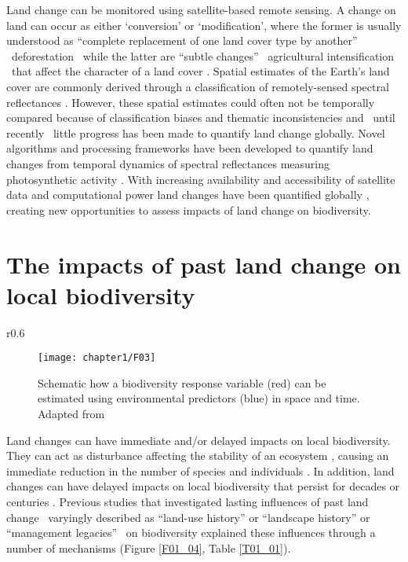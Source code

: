 Land change can be monitored using satellite-based remote sensing. A change on land can occur as either ‘conversion’ or ‘modification’, where the former is usually understood as “complete replacement of one land cover type by another” \textendash\ \ie deforestation \textendash\ while the latter are “subtle changes” \textendash\ \ie agricultural intensification \textendash\ that affect the character of a land cover \citep{Lambin2003,Lambin2006}. Spatial estimates of the Earth’s land cover are commonly derived through a classification of remotely-sensed spectral reflectances \citep{DeFries1994,Hansen2000,DiGregorio2000}. However, these spatial estimates could often not be temporally compared because of classification biases and thematic inconsistencies \citep{VERBURG2011,Estes2018} and \textendash\ until recently \textendash\ little progress has been made to quantify land change globally. Novel algorithms and processing frameworks have been developed to quantify land changes from temporal dynamics of spectral reflectances measuring photosynthetic activity \citep[Figure \ref{F01_02}\textbf{c}, ][]{Lhermitte2011,Gomez2016,Zhu2017}. With increasing availability and accessibility of satellite data \citep{Wulder2015} and computational power \citep{Gorelick2017} land changes have been quantified globally \citep{Hansen2013,Pekel2016,Li2018,Song2018}, creating new opportunities to  assess impacts of land change on biodiversity.   

\section{The impacts of past land change on local biodiversity}
\label{C01_02}

\begin{wrapfigure}{r}{0.6\textwidth}
    \begin{figure}[htb]
    \centering
    \texttt{[image: chapter1/F03]}
    \caption{ Schematic how a biodiversity response variable (red) can be estimated using environmental predictors (blue) in space and time. Adapted from \cite{Ferrier2017} }
    \label{F01_03}
    \end{figure}
\end{wrapfigure}

Land changes can have immediate and/or delayed impacts on local biodiversity. They can act as disturbance affecting the stability of an ecosystem \citep{Pimm1984,Scheffer2003}, causing an immediate reduction in the number of species and individuals \citep{Nimmo2015,Ratajczak2018}. In addition, land changes can have delayed impacts on local biodiversity that persist for decades \citep{Martin2013,Moreno-Mateos2017} or centuries \citep{Vegas-Vilarrubia2011,McMichael2017}. Previous studies that investigated lasting influences of past land change \textendash\ varyingly described as “land-use history” or “landscape history” \citep{Bellemare2002,Foster2003,Ewers2013} or “management legacies” \citep{Perring2015} \textendash\ on biodiversity explained these influences through a number of mechanisms (Figure \ref{F01_04}, Table \ref{T01_01}).

